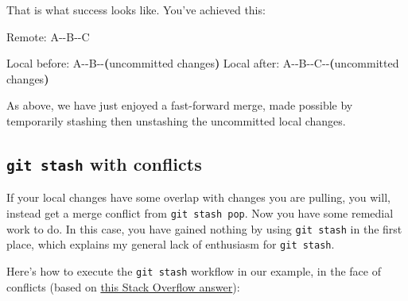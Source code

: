 \documentclass[
]{book}
\newenvironment{Shaded}{\begin{snugshade}}{\end{snugshade}}
\newcommand{\BuiltInTok}[1]{#1}
\newcommand{\ErrorTok}[1]{\textcolor[rgb]{0.64,0.00,0.00}{\textbf{#1}}}
\newcommand{\ExtensionTok}[1]{#1}
\newcommand{\KeywordTok}[1]{\textcolor[rgb]{0.13,0.29,0.53}{\textbf{#1}}}
\newcommand{\NormalTok}[1]{#1}
\begin{document}
That is what success looks like. You've achieved this:

\begin{Shaded}
\begin{Highlighting}[]
      \ExtensionTok{Remote:}\NormalTok{ A{-}{-}B{-}{-}C}

\ExtensionTok{Local}\NormalTok{ before: A{-}{-}B{-}{-}}\ErrorTok{(}\ExtensionTok{uncommitted}\NormalTok{ changes}\KeywordTok{)}
 \ExtensionTok{Local}\NormalTok{ after: A{-}{-}B{-}{-}C{-}{-}}\ErrorTok{(}\ExtensionTok{uncommitted}\NormalTok{ changes}\KeywordTok{)}
\end{Highlighting}
\end{Shaded}

As above, we have just enjoyed a fast-forward merge, made possible by temporarily stashing then unstashing the uncommitted local changes.

\subsection{\texorpdfstring{\texttt{git\ stash} with conflicts}{git stash with conflicts}}\label{git-stash-with-conflicts}

If your local changes have some overlap with changes you are pulling, you will, instead get a merge conflict from \texttt{git\ stash\ pop}. Now you have some remedial work to do. In this case, you have gained nothing by using \texttt{git\ stash} in the first place, which explains my general lack of enthusiasm for \texttt{git\ stash}.

Here's how to execute the \texttt{git\ stash} workflow in our example, in the face of conflicts (based on \href{https://stackoverflow.com/a/27382210/2825349}{this Stack Overflow answer}):

\begin{Shaded}
\end{Shaded}
\end{document}
